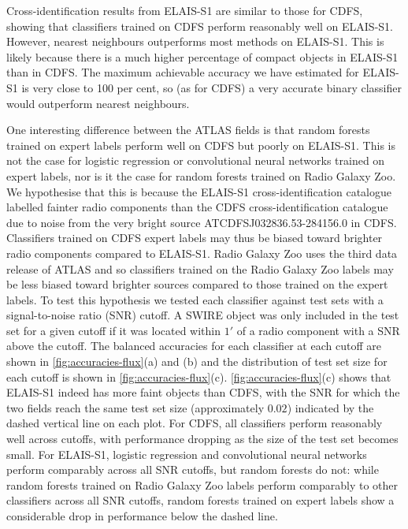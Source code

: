 \documentclass[fleqn,usenatbib,usedcolumn]{mnras}
\begin{document}
  Cross-identification results from ELAIS-S1 are similar to those for CDFS,
  showing that classifiers trained on CDFS perform reasonably well on
  ELAIS-S1. However, nearest neighbours outperforms most methods on ELAIS-S1.
  This is likely because there is a much higher percentage of compact objects in ELAIS-S1 than in CDFS. The maximum achievable accuracy we have estimated for ELAIS-S1 is very close to 100 per cent, so (as for CDFS) a very accurate binary classifier would outperform nearest neighbours.

  One interesting difference between the ATLAS fields is that random forests trained on expert labels perform well on CDFS but poorly on ELAIS-S1. This is not the case for logistic regression or convolutional neural networks trained on expert labels, nor is it the case for random forests trained on Radio Galaxy Zoo. We hypothesise that this is because the ELAIS-S1 cross-identification catalogue \citep{middelberg08} labelled fainter radio components than the CDFS cross-identification catalogue \citep{norris06} due to noise from the very bright source ATCDFS\textunderscore{}J032836.53-284156.0 in CDFS. Classifiers trained on CDFS expert labels may thus be biased toward brighter radio components compared to ELAIS-S1. Radio Galaxy Zoo uses the third data release of ATLAS \citep{franzen15} and so classifiers trained on the Radio Galaxy Zoo labels may be less biased toward brighter sources compared to those trained on the expert labels. To test this hypothesis we tested each classifier against test sets with a signal-to-noise ratio (SNR) cutoff. A SWIRE object was only included in the test set for a given cutoff if it was located within $1'$ of a radio component with a SNR above the cutoff. The balanced accuracies for each classifier at each cutoff are shown in \autoref{fig:accuracies-flux}(a) and (b) and the distribution of test set size for each cutoff is shown in \autoref{fig:accuracies-flux}(c). \autoref{fig:accuracies-flux}(c) shows that ELAIS-S1 indeed has more faint objects than CDFS, with the SNR for which the two fields reach the same test set size (approximately $0.02$) indicated by the dashed vertical line on each plot. For CDFS, all classifiers perform reasonably well across cutoffs, with performance dropping as the size of the test set becomes small. For ELAIS-S1, logistic regression and convolutional neural networks perform comparably across all SNR cutoffs, but random forests do not: while random forests trained on Radio Galaxy Zoo labels perform comparably to other classifiers across all SNR cutoffs, random forests trained on expert labels show a considerable drop in performance below the dashed line.
\end{document}
